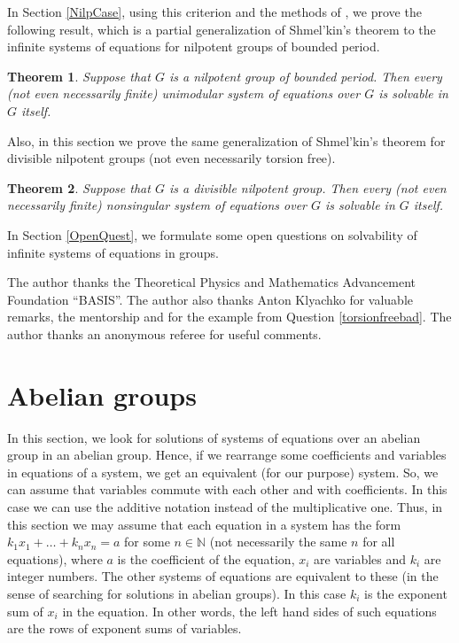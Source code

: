 \documentclass{article}
\newtheorem{theorem}{Theorem}
\theoremstyle{definition}
\theoremstyle{remark}
\begin{document}
In Section \ref{NilpCase},
using this criterion and the methods of \cite{Sh67},
we prove the following result,
which is a partial generalization
of Shmel'kin's theorem to the infinite systems
of equations for nilpotent groups of bounded period.
\begin{theorem}\label{theorembound}
Suppose that $G$ is a nilpotent group of bounded period.
Then every (not even necessarily finite)
unimodular system of equations over $G$
is solvable in $G$ itself.
\end{theorem}
Also, in this section we prove the same generalization
of Shmel'kin's theorem for divisible nilpotent groups
(not even necessarily torsion free).
\begin{theorem}\label{theoremdiv}
Suppose that $G$ is a divisible nilpotent group.
Then every (not even necessarily finite)
nonsingular system of equations over $G$
is solvable in $G$ itself.
\end{theorem}

In Section \ref{OpenQuest}, we formulate some open questions
on solvability of infinite systems of equations in groups.

The author thanks the Theoretical Physics and Mathematics
Advancement Foundation ``BASIS''.
The author also thanks Anton Klyachko
for valuable remarks, the mentorship
and for the example from Question \ref{torsionfreebad}.
The author thanks an anonymous referee
for useful comments.

\section{Abelian groups} \label{AbCase}

In this section, we look for solutions of systems of equations
over an abelian group in an abelian group.
Hence, if we rearrange some coefficients and variables
in equations of a system, we get an equivalent
(for our purpose) system.
So, we can assume that variables commute with each other and with coefficients.
In this case we can use the additive notation
instead of the multiplicative one.
Thus, in this section we may assume that
each equation in a system has the form
$k_1x_1 + \ldots + k_nx_n = a$ for some $n\in \mathbb N$
(not necessarily the same $n$ for all equations),
where $a$ is the coefficient of the equation, $x_i$ are
variables and $k_i$ are integer numbers.
The other systems of equations are equivalent to these
(in the sense of searching for solutions in abelian groups).
In this case $k_i$ is the exponent sum of
$x_i$ in the equation.
In other words, the left hand sides of such equations
are the rows of exponent sums of variables.
\end{document}
